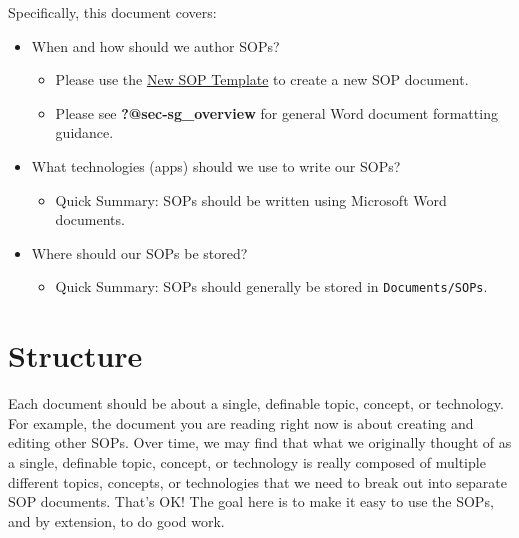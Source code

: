 \documentclass[
  letterpaper,
  DIV=11,
  numbers=noendperiod]{scrreprt}
\providecommand{\tightlist}{%
  \setlength{\itemsep}{0pt}\setlength{\parskip}{0pt}}\usepackage{longtable,booktabs,array}
\begin{document}
Specifically, this document covers:

\begin{itemize}
\tightlist
\item
  When and how should we author SOPs?

  \begin{itemize}
  \tightlist
  \item
    Please use the
    \href{https://uthtmc.sharepoint.com/:w:/r/sites/SPHCannellResearch/Shared\%20Documents/SOPs/SOP\%20Template.docx?d=wdca3cccdecd5484cabeb5054608e5b33&csf=1&web=1&e=HiuhkD}{New
    SOP Template} to create a new SOP document.
  \item
    Please see \textbf{?@sec-sg\_overview} for general Word document
    formatting guidance.
  \end{itemize}
\item
  What technologies (apps) should we use to write our SOPs?

  \begin{itemize}
  \tightlist
  \item
    Quick Summary: SOPs should be written using Microsoft Word
    documents.
  \end{itemize}
\item
  Where should our SOPs be stored?

  \begin{itemize}
  \tightlist
  \item
    Quick Summary: SOPs should generally be stored in
    \texttt{Documents/SOPs}.
  \end{itemize}
\end{itemize}

\chapter*{Structure}\label{sec-as_structure}


Each document should be about a single, definable topic, concept, or
technology. For example, the document you are reading right now is about
creating and editing other SOPs. Over time, we may find that what we
originally thought of as a single, definable topic, concept, or
technology is really composed of multiple different topics, concepts, or
technologies that we need to break out into separate SOP documents.
That's OK! The goal here is to make it easy to use the SOPs, and by
extension, to do good work.
\end{document}
